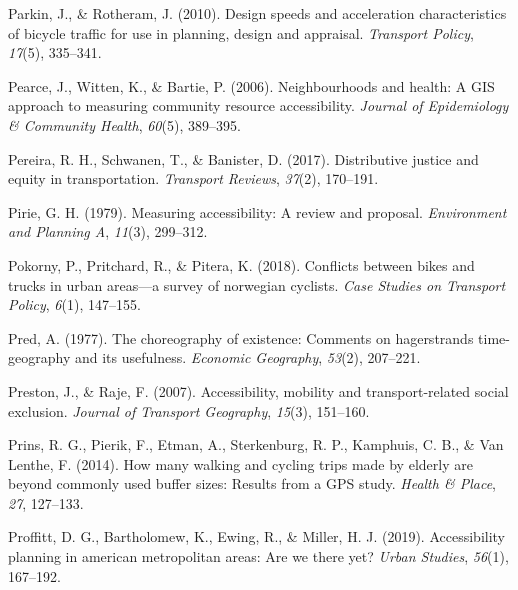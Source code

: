 \documentclass[
11pt, %
oneside, %
english, %
singlespacing, %
]{macthesis} %
\newlength{\cslhangindent}
\newenvironment{CSLReferences}[2] %
 {%
  \setlength{\parindent}{0pt}
  \ifodd #1 \everypar{\setlength{\hangindent}{\cslhangindent}}\ignorespaces\fi
  \ifnum #2 > 0
  \setlength{\parskip}{#2\baselineskip}
  \fi
 }%
 {}
\begin{document}
\begin{CSLReferences}{1}{0}
\leavevmode{}%
Parkin, J., \& Rotheram, J. (2010). Design speeds and acceleration characteristics of bicycle traffic for use in planning, design and appraisal. \emph{Transport Policy}, \emph{17}(5), 335--341.

\leavevmode{}%
Pearce, J., Witten, K., \& Bartie, P. (2006). Neighbourhoods and health: A GIS approach to measuring community resource accessibility. \emph{Journal of Epidemiology \& Community Health}, \emph{60}(5), 389--395.

\leavevmode{}%
Pereira, R. H., Schwanen, T., \& Banister, D. (2017). Distributive justice and equity in transportation. \emph{Transport Reviews}, \emph{37}(2), 170--191.

\leavevmode{}%
Pirie, G. H. (1979). Measuring accessibility: A review and proposal. \emph{Environment and Planning A}, \emph{11}(3), 299--312.

\leavevmode{}%
Pokorny, P., Pritchard, R., \& Pitera, K. (2018). Conflicts between bikes and trucks in urban areas---a survey of norwegian cyclists. \emph{Case Studies on Transport Policy}, \emph{6}(1), 147--155.

\leavevmode{}%
Pred, A. (1977). The choreography of existence: Comments on hagerstrands time-geography and its usefulness. \emph{Economic Geography}, \emph{53}(2), 207--221.

\leavevmode{}%
Preston, J., \& Raje, F. (2007). Accessibility, mobility and transport-related social exclusion. \emph{Journal of Transport Geography}, \emph{15}(3), 151--160.

\leavevmode{}%
Prins, R. G., Pierik, F., Etman, A., Sterkenburg, R. P., Kamphuis, C. B., \& Van Lenthe, F. (2014). How many walking and cycling trips made by elderly are beyond commonly used buffer sizes: Results from a GPS study. \emph{Health \& Place}, \emph{27}, 127--133.

\leavevmode{}%
Proffitt, D. G., Bartholomew, K., Ewing, R., \& Miller, H. J. (2019). Accessibility planning in american metropolitan areas: Are we there yet? \emph{Urban Studies}, \emph{56}(1), 167--192.


\end{CSLReferences}
\end{document}
